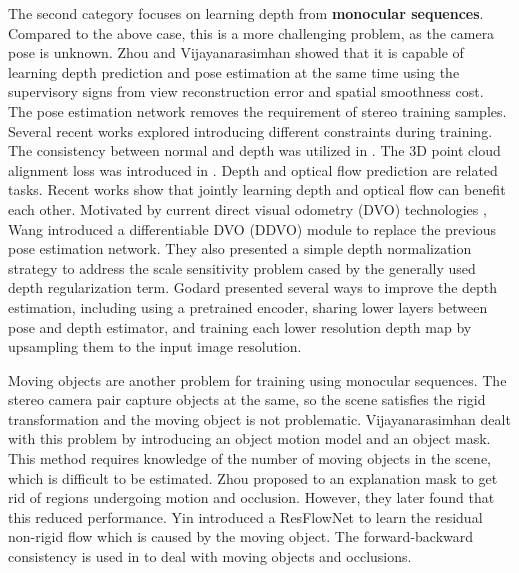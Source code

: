 \documentclass[10pt,twocolumn,letterpaper]{article}
\begin{document}
The second category focuses on learning depth from \textbf{monocular sequences}. Compared to the above case,  this is a more challenging problem, as the camera pose is unknown. Zhou \etal \cite{zhou2017unsupervised} and Vijayanarasimhan \etal \cite{vijayanarasimhan2017sfm} showed that it is capable of  learning depth prediction and pose estimation at the same time using the supervisory signs from view reconstruction error and spatial smoothness cost. The pose estimation network removes the requirement of stereo training samples. Several recent works explored introducing different constraints during training. The consistency between normal and depth was utilized in \cite{yang2018unsupervised}. The 3D point cloud alignment loss was introduced in \cite{mahjourian2018unsupervised}.  Depth and optical flow prediction are related tasks. Recent works \cite{yin2018geonet,zou2018df} show that jointly learning depth and optical flow can benefit each other.  Motivated by current direct visual odometry (DVO) technologies \cite{engel2014lsd,engel2018direct}, Wang \etal \cite{wang2018learning} introduced a differentiable DVO (DDVO) module to replace the previous pose estimation network. They also presented a simple depth normalization strategy to address the scale sensitivity problem cased by the generally used depth regularization term. Godard \etal \cite{godard2018digging} presented several ways to improve the depth estimation, including using a pretrained encoder, sharing lower layers between pose and depth estimator, and training each lower resolution depth map by upsampling them to the input image resolution. 


Moving objects are another problem for  training using monocular sequences. The stereo camera pair capture objects at the same, so the scene satisfies the rigid transformation and the moving object is not problematic.    Vijayanarasimhan \etal \cite{vijayanarasimhan2017sfm} dealt with this problem by introducing an object motion model and an object mask. This method requires knowledge of the number of moving objects in the scene, which is difficult to be estimated.  Zhou \etal \cite{zhou2017unsupervised} proposed to an explanation mask to get rid of regions undergoing motion and occlusion. However, they later found that this reduced performance. Yin \etal \cite{yin2018geonet} introduced a ResFlowNet to learn the residual non-rigid flow which is caused by the moving object. The forward-backward consistency is used in \cite{zou2018df,yin2018geonet} to deal with moving objects and occlusions.
\end{document}
